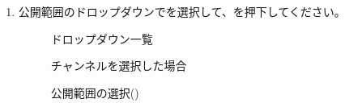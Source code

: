 \begin{enumerate}
    \newpage
    \item 公開範囲のドロップダウンでを選択して、を押下してください。
        \begin{figure}[htbp]
            \begin{minipage}[b]{0.45\linewidth}
                \centering
                \caption{ドロップダウン一覧}
                \label{img:guide3}
            \end{minipage}
            \begin{minipage}[b]{0.45\linewidth}
                \centering
                \caption{チャンネルを選択した場合}
                \label{img:guide4}
            \end{minipage}
            \caption*{\mi 公開範囲の選択(\currentVersion)}
        \end{figure}


\end{enumerate}
